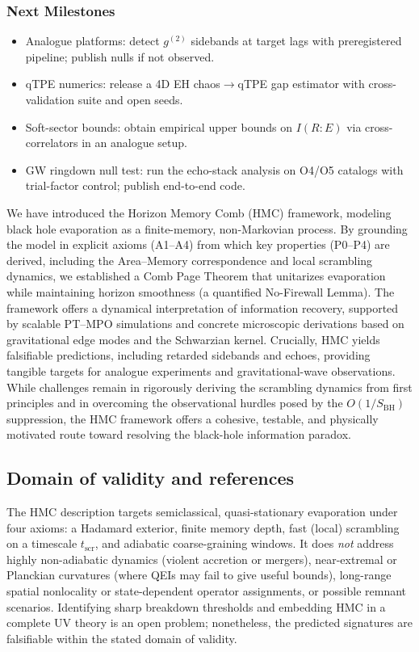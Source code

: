 \documentclass[aps,prd,preprint,onecolumn,superscriptaddress,nofootinbib,longbibliography,floatfix,11pt,showpacs,showkeys]{revtex4-2}
\newcommand{\HMC}{\textsc{HMC}\xspace}
\newcommand{\BH}{\mathrm{BH}}
\newcommand{\scr}{\mathrm{scr}}
\theoremstyle{plain}
\theoremstyle{definition}
\theoremstyle{remark}
\begin{document}
\subsubsection{Next Milestones}
\begin{itemize}[leftmargin=*]
\item Analogue platforms: detect $g^{(2)}$ sidebands at target lags with preregistered pipeline; publish nulls if not observed.
\item qTPE numerics: release a 4D EH chaos$\to$qTPE gap estimator with cross-validation suite and open seeds.
\item Soft-sector bounds: obtain empirical upper bounds on $I(R{:}E)$ via cross-correlators in an analogue setup.
\item GW ringdown null test: run the echo-stack analysis on O4/O5 catalogs with trial-factor control; publish end-to-end code.
\end{itemize}
We have introduced the Horizon Memory Comb (\HMC{}) framework, modeling black hole evaporation as a finite-memory, non-Markovian process. By grounding the model in explicit axioms (A1--A4) from which key properties (P0--P4) are derived, including the Area--Memory correspondence and local scrambling dynamics, we established a Comb Page Theorem that unitarizes evaporation while maintaining horizon smoothness (a quantified No-Firewall Lemma). The framework offers a dynamical interpretation of information recovery, supported by scalable PT--MPO simulations and concrete microscopic derivations based on gravitational edge modes and the Schwarzian kernel. Crucially, \HMC{} yields falsifiable predictions, including retarded sidebands and echoes, providing tangible targets for analogue experiments and gravitational-wave observations. While challenges remain in rigorously deriving the scrambling dynamics from first principles and in overcoming the observational hurdles posed by the $O(1/S_{\BH})$ suppression, the \HMC{} framework offers a cohesive, testable, and physically motivated route toward resolving the black-hole information paradox.

\subsection{Domain of validity and references}
The \HMC{} description targets semiclassical, quasi-stationary evaporation under four axioms: a Hadamard exterior, finite memory depth, fast (local) scrambling on a timescale $t_{\scr}$, and adiabatic coarse-graining windows. It does \emph{not} address highly non-adiabatic dynamics (violent accretion or mergers), near-extremal or Planckian curvatures (where QEIs may fail to give useful bounds), long-range spatial nonlocality or state-dependent operator assignments, or possible remnant scenarios. Identifying sharp breakdown thresholds and embedding \HMC{} in a complete UV theory is an open problem; nonetheless, the predicted signatures are falsifiable within the stated domain of validity.
\end{document}
